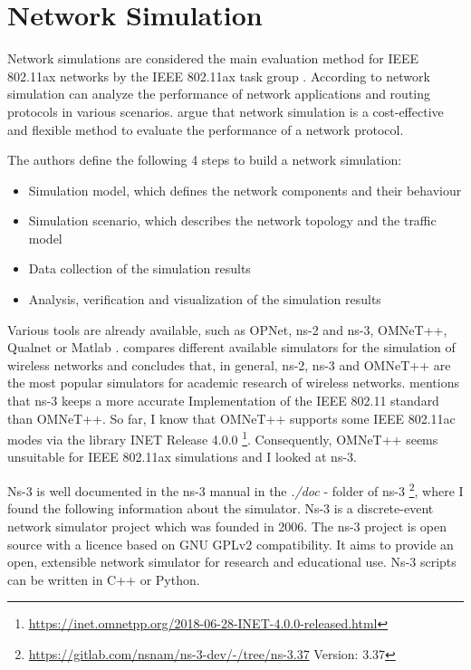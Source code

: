 \section{Network Simulation}
\label{sec:network_simulation}

Network simulations are considered the main evaluation method for IEEE 802.11ax networks by the IEEE 802.11ax task group \cite{omar_survey_2016}.
According to \textcite{manpreet_survey_2014} network simulation can analyze the performance of network applications and routing protocols in various scenarios.
\textcite{kumar_simulators_2012} argue that network simulation is a cost-effective and flexible method to evaluate the performance of a network protocol.

The authors define the following \num{4} steps to build a network simulation:
\begin{itemize}
    \item Simulation model, which defines the network components and their behaviour
    \item Simulation scenario, which describes the network topology and the traffic model
    \item Data collection of the simulation results
    \item Analysis, verification and visualization of the simulation results
\end{itemize}

Various tools are already available, such as OPNet, ns-2 and ns-3, OMNeT++, Qualnet \cite{kumar_simulators_2012, manpreet_survey_2014} or Matlab \cite{keller_simulation_2021}.
\textcite{kumar_simulators_2012} compares different available simulators for the simulation of wireless networks and concludes that,
in general, ns-2, ns-3 and OMNeT++ are the most popular simulators for academic research of wireless networks.
\textcite{keller_simulation_2021} mentions that ns-3 keeps a more accurate Implementation of the IEEE 802.11 standard than OMNeT++.
So far, I know that OMNeT++ supports some IEEE 802.11ac modes via the library INET Release 4.0.0 \footnote{\url{https://inet.omnetpp.org/2018-06-28-INET-4.0.0-released.html}}.
Consequently, OMNeT++ seems unsuitable for IEEE 802.11ax simulations and I looked at ns-3.

Ns-3 is well documented in the ns-3 manual in the \textit{./doc} - folder of ns-3 \footnote{\url{https://gitlab.com/nsnam/ns-3-dev/-/tree/ns-3.37} Version: 3.37}, where I found the following information about the simulator.
Ns-3 is a discrete-event network simulator project which was founded in 2006.
The ns-3 project is open source with a licence based on GNU GPLv2 compatibility.
It aims to provide an open, extensible network simulator for research and educational use.
Ns-3 scripts can be written in C++ or Python.

